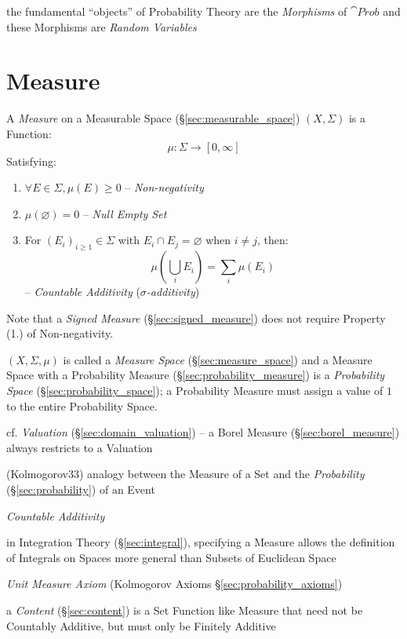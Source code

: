 the fundamental ``objects'' of Probability Theory are the \emph{Morphisms} of
$\cat{Prob}$ and these Morphisms are \emph{Random Variables}



\section{Measure}\label{sec:measure}

A \emph{Measure} on a Measurable Space (\S\ref{sec:measurable_space})
$(X,\Sigma)$ is a Function:
\[
  \mu : \Sigma \rightarrow [0,\infty]
\]
Satisfying:
\begin{enumerate}
  \item $\forall E \in \Sigma, \mu(E) \geq 0$ -- \emph{Non-negativity}
  \item $\mu(\varnothing) = 0$ -- \emph{Null Empty Set}
  \item For $(E_i)_{i \geq 1} \in \Sigma$ with $E_i \cap E_j = \varnothing$
    when $i \neq j$, then:
    \[
      \mu (\bigcup_i E_i) = \sum_i \mu(E_i)
    \]
    -- \emph{Countable Additivity} (\emph{$\sigma$-additivity})
\end{enumerate}
Note that a \emph{Signed Measure} (\S\ref{sec:signed_measure}) does not require
Property (1.) of Non-negativity.

$(X,\Sigma,\mu)$ is called a \emph{Measure Space} (\S\ref{sec:measure_space})
and a Measure Space with a Probability Measure
(\S\ref{sec:probability_measure}) is a \emph{Probability Space}
(\S\ref{sec:probability_space}); a Probability Measure must assign a value of
$1$ to the entire Probability Space.

\fist cf. \emph{Valuation} (\S\ref{sec:domain_valuation}) -- a Borel Measure
(\S\ref{sec:borel_measure}) always restricts to a Valuation

(Kolmogorov33) analogy between the Measure of a Set and the \emph{Probability}
(\S\ref{sec:probability}) of an Event

\emph{Countable Additivity}

in Integration Theory (\S\ref{sec:integral}), specifying a Measure allows the
definition of Integrals on Spaces more general than Subsets of Euclidean Space

\fist \emph{Unit Measure Axiom} (Kolmogorov Axioms
\S\ref{sec:probability_axioms})

\fist a \emph{Content} (\S\ref{sec:content}) is a Set Function like Measure that
need not be Countably Additive, but must only be Finitely Additive



